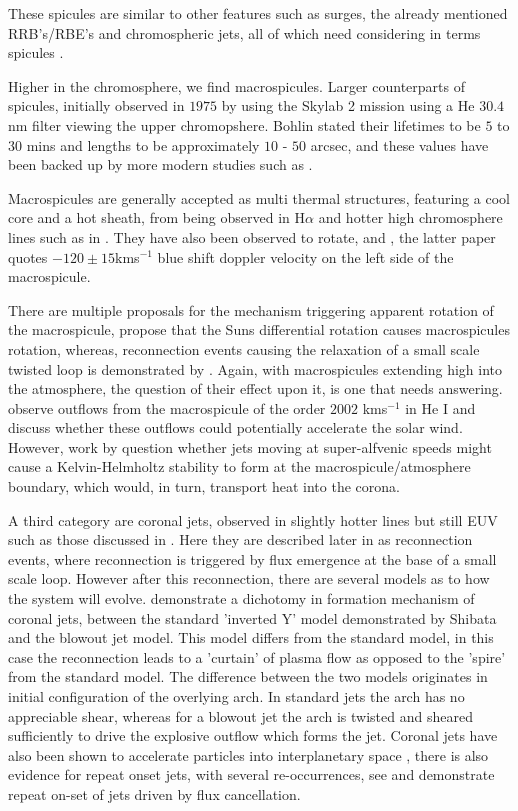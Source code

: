 \documentclass{emulateapj}
\begin{document}
These spicules are similar to other features such as surges, the already mentioned RRB's/RBE's and chromospheric jets, all of which need considering in terms spicules \citep{Tsiropoula2012}.


Higher in the chromosphere, we find macrospicules. 
Larger counterparts of spicules, initially observed in $1975$ by \cite{Bohlin1975} using the Skylab 2 mission using a He $30.4$ nm filter viewing the upper chromopshere.
Bohlin stated their lifetimes to be $5$ to $30$ mins and lengths to be approximately $10$ - $50$ arcsec, and these values have been backed up by more modern studies such as \cite{Bennett2015}.

Macrospicules are generally accepted as multi thermal structures, featuring a cool core and a hot sheath, from being observed in H$\alpha$ \citep{LaBonte79} and hotter high chromosphere lines such as in \cite{Parenti2002}.
They have also been observed to rotate, \cite{Pike_Mason1998} and \cite{Kamio2010}, the latter paper quotes $-120 \pm 15$kms$^{-1}$ blue shift doppler velocity on the left side of the macrospicule. 

There are multiple proposals for the mechanism triggering apparent rotation of the macrospicule, \cite{Curdt2011} propose that the Suns differential rotation causes macrospicules rotation, whereas, reconnection events causing the relaxation of a small scale twisted loop is demonstrated by \cite{Adams2014}.
Again, with macrospicules extending high into the atmosphere, the question of their effect upon it, is one that needs answering.
\cite{Pike_Harrison1997} observe outflows from the macrospicule of the order $2002$ kms$^{-1}$ in He I and discuss whether these outflows could potentially accelerate the solar wind.
However, work by \cite{Zaqarashvili2014} question whether jets moving at super-alfvenic speeds might cause a Kelvin-Helmholtz stability to form at the macrospicule/atmosphere boundary, which would, in turn, transport heat into the corona.

A third  category are coronal jets, observed in slightly hotter lines but still EUV such as those discussed in \cite{Shibata1992}.
Here they are described later in \cite{Shibata1994} as reconnection events, where reconnection is triggered by flux emergence at the base of a small scale loop.
However after this reconnection, there are several models as to how the system will evolve.
\cite{Moore2010} demonstrate a dichotomy in formation mechanism of coronal jets, between the standard 'inverted Y' model demonstrated by Shibata and the blowout jet model. 
This model differs from the standard model, in this case the reconnection leads to a 'curtain' of plasma flow as opposed to the 'spire' from the standard model.
The difference between the two models originates in initial configuration of the overlying arch. 
In standard jets the arch has no appreciable shear, whereas for a blowout jet the arch is twisted and sheared sufficiently to drive the explosive outflow which forms the jet.
Coronal jets have also been shown to accelerate particles into interplanetary space \citep{Li2011}, there is also evidence for repeat onset jets, with several re-occurrences, see \cite{Li2011} and \cite{Chifor2008} demonstrate repeat on-set of jets driven by flux cancellation.
\end{document}
